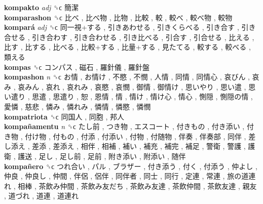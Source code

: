 \textbf{kompakto} \emph{adj}  ␝ϲ   簡潔   \\
\textbf{komparashon} ␝ϲ   比べ ,  比べ物 ,  比物 ,  比較 ,  較 ,  較べ ,  較べ物 ,  較物   \\
\textbf{kompará} \emph{adj}  ␝ϲ   同一視+する ,  引きあわせる ,  引きくらべる ,  引き合す ,  引き合せる ,  引き合わす ,  引き合わせる ,  引き比べる ,  引合す ,  引合せる ,  比える ,  比す ,  比する ,  比べる ,  比較+する ,  比量+する ,  見たてる ,  較する ,  較べる ,  類える   \\
\textbf{kompas} ␝ϲ   コンパス ,  磁石 ,  羅針儀 ,  羅針盤   \\
\textbf{kompashon} \emph{n}  ␝ϲ   お情 ,  お情け ,  不愍 ,  不憫 ,  人情 ,  同情 ,  同情心 ,  哀びん ,  哀み ,  哀みん ,  哀れ ,  哀れみ ,  哀愍 ,  哀憫 ,  御情 ,  御情け ,  思いやり ,  思い遣 ,  思い遣り ,  思遣 ,  思遣り ,  恕 ,  恩情 ,  情 ,  情け ,  情け心 ,  情心 ,  惻隠 ,  惻隠の情 ,  愛憐 ,  慈悲 ,  憐み ,  憐れみ ,  憐情 ,  憐愍 ,  憐憫   \\
\textbf{kompatriota} ␝ϲ   同国人 ,  同胞 ,  邦人   \\
\textbf{kompañamentu} \emph{n}  ␝ϲ   たし前 ,  つき物 ,  エスコート ,  付きもの ,  付き添い ,  付き物 ,  付け物 ,  付もの ,  付添 ,  付添い ,  付物 ,  付随物 ,  伴奏 ,  伴奏部 ,  同伴 ,  差し添え ,  差添 ,  差添え ,  相伴 ,  相補 ,  補い ,  補充 ,  補完 ,  補足 ,  警衛 ,  警護 ,  護衛 ,  護送 ,  足し ,  足し前 ,  足前 ,  附き添い ,  附添い ,  随伴   \\
\textbf{kompañero} ␝ϲ   つれ合い ,  パル ,  ブラザー ,  付き添う ,  付く ,  付添う ,  仲よし ,  仲良 ,  仲良し ,  仲間 ,  伴侶 ,  侶伴 ,  同伴者 ,  同士 ,  同行 ,  定連 ,  常連 ,  旅の道連れ ,  相棒 ,  茶飲み仲間 ,  茶飲み友だち ,  茶飲み友達 ,  茶飲仲間 ,  茶飲友達 ,  親友 ,  道づれ ,  道連 ,  道連れ   \\
